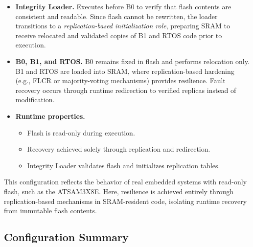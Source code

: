 \begin{itemize}
  \item \textbf{Integrity Loader.}
        Executes before B0 to verify that flash contents are consistent and
        readable. Since flash cannot be rewritten, the loader transitions to a
        \emph{replication-based initialization role}, preparing SRAM to receive
        relocated and validated copies of B1 and RTOS code prior to execution.

  \item \textbf{B0, B1, and RTOS.}
        B0 remains fixed in flash and performs relocation only. B1 and RTOS are
        loaded into SRAM, where replication-based hardening (e.g., FLCR or
        majority-voting mechanisms) provides resilience. Fault recovery occurs
        through runtime redirection to verified replicas instead of modification.

  \item \textbf{Runtime properties.}
        \begin{itemize}
          \item Flash is read-only during execution.
          \item Recovery achieved solely through replication and redirection.
          \item Integrity Loader validates flash and initializes replication tables.
        \end{itemize}
\end{itemize}

This configuration reflects the behavior of real embedded systems with
read-only flash, such as the ATSAM3X8E. Here, resilience is achieved entirely
through replication-based mechanisms in SRAM-resident code, isolating runtime
recovery from immutable flash contents.

\subsection*{Configuration Summary}

